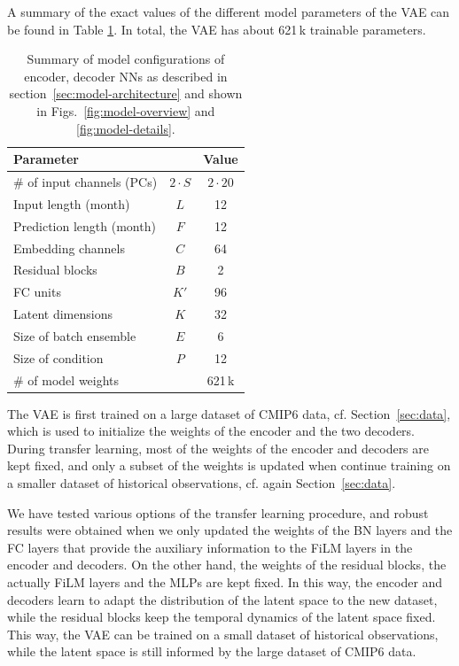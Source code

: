 \documentclass[english,a4paper,10pt]{scrartcl}
\begin{document}
A summary of the exact values of the different model parameters of the VAE can be found in Table \ref{tab:model-params}. In total, the VAE has about 621\,k trainable parameters.
\begin{table}
    \caption{\label{tab:model-params}Summary of model configurations of encoder, decoder NNs as described in section~\ref{sec:model-architecture} and shown in Figs.~\ref{fig:model-overview} and \ref{fig:model-details}.}
    \centering{}
    \begin{tabular}{lcc}
        \toprule
        Parameter                  &             & Value        \\
        \midrule
        \# of input channels (PCs) & $2 \cdot S$ & $2 \cdot 20$ \\
        Input length (month)       & $L$         & 12           \\
        Prediction length (month)  & $F$         & 12           \\
        Embedding channels         & $C$         & 64           \\
        Residual blocks            & $B$         & 2            \\
        FC units                   & $K'$        & 96           \\
        Latent dimensions          & $K$         & 32           \\
        Size of batch ensemble     & $E$         & 6            \\
        Size of condition          & $P$         & 12           \\
        \midrule
        \# of model weights        &             & 621\,k       \\
        \bottomrule
    \end{tabular}
\end{table}

The VAE is first trained on a large dataset of CMIP6 data, cf. Section~\ref{sec:data}, which is used to initialize the weights of the encoder and the two decoders. During transfer learning, most of the weights of the encoder and decoders are kept fixed, and only a subset of the weights is updated when continue training on a smaller dataset of historical observations, cf. again Section~\ref{sec:data}.

We have tested various options of the transfer learning procedure, and robust results were obtained when we only updated the weights of the BN layers and the FC layers that provide the auxiliary information to the FiLM layers in the encoder and decoders. On the other hand, the weights of the residual blocks, the actually FiLM layers and the MLPs are kept fixed. In this way, the encoder and decoders learn to adapt the distribution of the latent space to the new dataset, while the residual blocks keep the temporal dynamics of the latent space fixed. This way, the VAE can be trained on a small dataset of historical observations, while the latent space is still informed by the large dataset of CMIP6 data.
\end{document}
